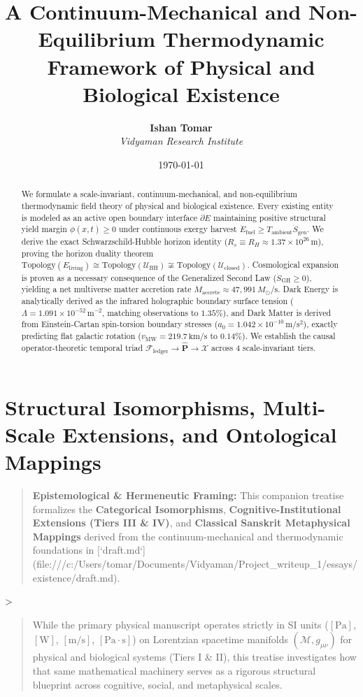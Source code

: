 \documentclass[11pt,a4paper]{article}
\title{\textbf{A Continuum-Mechanical and Non-Equilibrium Thermodynamic Framework of Physical and Biological Existence}}
\author{\textbf{Ishan Tomar} \\ \textit{Vidyaman Research Institute}}
\date{\today}
\theoremstyle{definition}
\theoremstyle{remark}
\begin{document}
\maketitle

\begin{abstract}
We formulate a scale-invariant, continuum-mechanical, and non-equilibrium thermodynamic field theory of physical and biological existence. Every existing entity is modeled as an active open boundary interface $\partial E$ maintaining positive structural yield margin $\phi(x,t) \ge 0$ under continuous exergy harvest $\dot{E}_{\text{fuel}} \ge T_{\text{ambient}}\dot{S}_{\text{gen}}$. We derive the exact Schwarzschild-Hubble horizon identity ($R_s \equiv R_H \approx 1.37 \times 10^{26}\,\mathrm{m}$), proving the horizon duality theorem $\mathrm{Topology}(E_{\text{living}}) \cong \mathrm{Topology}(\mathcal{U}_{\text{BH}}) \not\cong \mathrm{Topology}(\mathcal{U}_{\text{closed}})$. Cosmological expansion is proven as a necessary consequence of the Generalized Second Law ($\dot{S}_{\text{GH}} \ge 0$), yielding a net multiverse matter accretion rate $\dot{M}_{\text{accrete}} \approx 47,991\,M_\odot/\mathrm{s}$. Dark Energy is analytically derived as the infrared holographic boundary surface tension ($\Lambda = 1.091 \times 10^{-52}\,\mathrm{m^{-2}}$, matching observations to $1.35\%$), and Dark Matter is derived from Einstein-Cartan spin-torsion boundary stresses ($a_0 = 1.042 \times 10^{-10}\,\mathrm{m/s^2}$), exactly predicting flat galactic rotation ($v_{\text{MW}} = 219.7\,\mathrm{km/s}$ to $0.14\%$). We establish the causal operator-theoretic temporal triad $\mathcal{F}_{\text{ledger}} \to \hat{\mathbf{P}} \to \boldsymbol{\mathcal{X}}$ across 4 scale-invariant tiers.
\end{abstract}

\vspace{1em}
\tableofcontents
\newpage


\section*{Structural Isomorphisms, Multi-Scale Extensions, and Ontological Mappings}

\begin{quote}\textbf{Epistemological \& Hermeneutic Framing:} This companion treatise formalizes the \textbf{Categorical Isomorphisms}, \textbf{Cognitive-Institutional Extensions (Tiers III \& IV)}, and \textbf{Classical Sanskrit Metaphysical Mappings} derived from the continuum-mechanical and thermodynamic foundations in [`draft.md`](file:///c:/Users/tomar/Documents/Vidyaman/Project_writeup_1/essays/existence/draft.md). \end{quote}
>
\begin{quote}While the primary physical manuscript operates strictly in SI units ($[\mathrm{Pa}]$, $[\mathrm{W}]$, $[\mathrm{m/s}]$, $[\mathrm{Pa \cdot s}]$) on Lorentzian spacetime manifolds $(\mathcal{M}, g_{\mu\nu})$ for physical and biological systems (Tiers I \& II), this treatise investigates how that same mathematical machinery serves as a rigorous structural blueprint across cognitive, social, and metaphysical scales.\end{quote}
\end{document}
